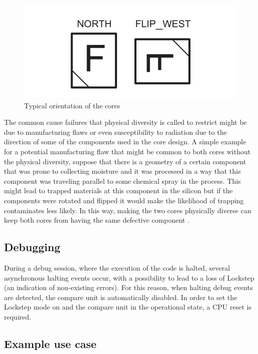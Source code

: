 \begin{figure}[H]

      \centering
      \includegraphics[width=0.8\linewidth]{images/lockstep_cpu_position.png}
      \caption{Typical orientation of the cores \citep{safety_maual_tms570ls31x}}
      \label{fig:lockstep_cpu_position}
    
\end{figure}

The common cause failures
that physical diversity is called to restrict might be due to manufacturing flaws
or even susceptibility to radiation due to the direction of some of the components
used in the core design. A simple example for a potential manufacturing flaw that
might be common to both cores without the physical diversity, suppose that there
is a geometry of a certain component that was prone to collecting moisture and it was processed in a way that this component was traveling parallel to some chemical spray in the process. This might lead to trapped materials at this component
in the silicon but if the components were rotated and flipped it would make the
likelihood of trapping contaminates less likely. In this way, making the two cores
physically diverse can keep both cores from having the same defective component \citep{lockstep_analysis}. 

\subsection{Debugging}

During a debug session, where the execution of the code is halted, several asynchronous halting events occur, with a possibility to lead to a loss of Lockstep (an indication of non-existing errors). For this reason, when halting debug events are
detected, the compare unit is automatically disabled. In order to set the Lockstep
mode on and the compare unit in the operational state, a CPU reset is required. \citep{TMS570LS31x21x_manual}

\subsection{Example use case}

